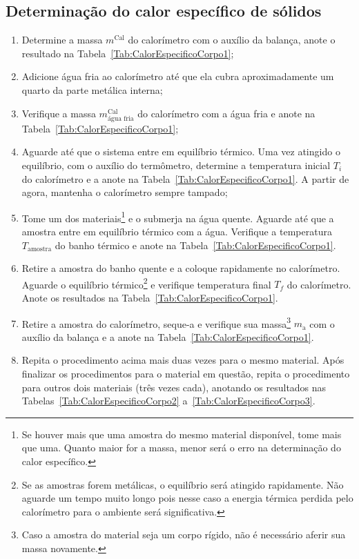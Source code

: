 \subsection{Determinação do calor específico de sólidos}

\begin{enumerate}
	\item Determine a massa $m^{\text{Cal}}$ do calorímetro com o auxílio da balança, anote o resultado na Tabela~\ref{Tab:CalorEspecificoCorpo1};
	\item Adicione água fria ao calorímetro até que ela cubra aproximadamente um quarto da parte metálica interna;
	\item Verifique a massa $m^{\text{Cal}}_{\text{água fria}}$ do calorímetro com a água fria e anote na Tabela~\ref{Tab:CalorEspecificoCorpo1};
	\item Aguarde até que o sistema entre em equilíbrio térmico. Uma vez atingido o equilíbrio, com o auxílio do termômetro, determine a temperatura inicial $T_i$ do calorímetro e a anote na Tabela~\ref{Tab:CalorEspecificoCorpo1}. A partir de agora, mantenha o calorímetro sempre tampado;
	\item Tome um dos materiais\footnote{Se houver mais que uma amostra do mesmo material disponível, tome mais que uma. Quanto maior for a massa, menor será o erro na determinação do calor específico.} e o submerja na água quente. Aguarde até que a amostra entre em equilíbrio térmico com a água. Verifique a temperatura $T_{\text{amostra}}$ do banho térmico e anote na Tabela~\ref{Tab:CalorEspecificoCorpo1}.
	\item Retire a amostra do banho quente e a coloque rapidamente no calorímetro. Aguarde o equilíbrio térmico\footnote{Se as amostras forem metálicas, o equilíbrio será atingido rapidamente. Não aguarde um tempo muito longo pois nesse caso a energia térmica perdida pelo calorímetro para o ambiente será significativa.} e verifique temperatura final $T_f$ do calorímetro. Anote os resultados na Tabela~\ref{Tab:CalorEspecificoCorpo1}.
	\item Retire a amostra do calorímetro, seque-a e verifique sua massa\footnote{Caso a amostra do material seja um corpo rígido, não é necessário aferir sua massa novamente.} $m_{\text{a}}$ com o auxílio da balança e a anote na Tabela~\ref{Tab:CalorEspecificoCorpo1}.
	\item Repita o procedimento acima mais duas vezes para o mesmo material. Após finalizar os procedimentos para o material em questão, repita o procedimento para outros dois materiais (três vezes cada), anotando os resultados nas Tabelas~\ref{Tab:CalorEspecificoCorpo2} a~\ref{Tab:CalorEspecificoCorpo3}.
\end{enumerate}

